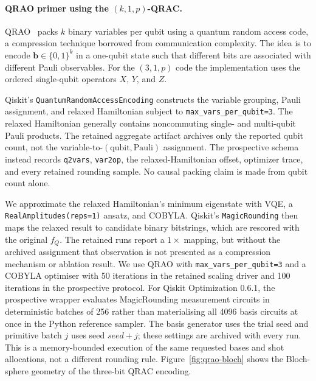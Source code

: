 \documentclass[5p,twocolumn,number,sort&compress,nopreprintline]{elsarticle}
\begin{document}
\paragraph{QRAO primer using the $(k,1,p)$-QRAC.}
QRAO~\cite{fuller2024qrao} packs $k$ binary variables per qubit
using a quantum random access code, a compression technique
borrowed from communication complexity. The idea is to encode
$\boldsymbol b\in\{0,1\}^k$ in a one-qubit state such that different
bits are associated with different Pauli observables. For the
$(3,1,p)$ code the implementation uses the ordered single-qubit
operators $X$, $Y$, and $Z$.

Qiskit's \texttt{QuantumRandomAccessEncoding} constructs the variable
grouping, Pauli assignment, and relaxed Hamiltonian subject to
\texttt{max\_vars\_per\_qubit=3}. The relaxed Hamiltonian generally
contains noncommuting single- and multi-qubit Pauli products. The
retained aggregate artifact archives only the reported qubit count,
not the variable-to-$(\text{qubit},\text{Pauli})$ assignment. The
prospective schema instead records \texttt{q2vars}, \texttt{var2op},
the relaxed-Hamiltonian offset, optimizer trace, and every retained
rounding sample. No causal packing claim is made from qubit count alone.

We approximate the relaxed Hamiltonian's minimum eigenstate with VQE,
a \texttt{RealAmplitudes(reps=1)} ansatz, and COBYLA. Qiskit's
\texttt{MagicRounding} then maps the relaxed result to candidate binary
bitstrings, which are rescored with the original $f_Q$. The retained
runs report a $1\times$ mapping, but without the archived assignment
that observation is not presented as a compression mechanism or
ablation result.
We use QRAO with \texttt{max\_vars\_per\_qubit=3} and a COBYLA optimiser
with 50 iterations in the retained scaling driver and 100 iterations in
the prospective protocol. For Qiskit Optimization 0.6.1, the prospective
wrapper evaluates MagicRounding measurement circuits in deterministic
batches of 256 rather than materialising all 4096 basis circuits at once
in the Python reference sampler.
The basis generator uses the trial seed and primitive batch $j$ uses
seed $\mathit{seed}+j$; these settings are archived with every run.
This is a memory-bounded execution of the same requested bases and shot
allocations, not a different rounding rule. Figure~\ref{fig:qrao-bloch} shows the
Bloch-sphere geometry of the three-bit QRAC encoding.
\end{document}
